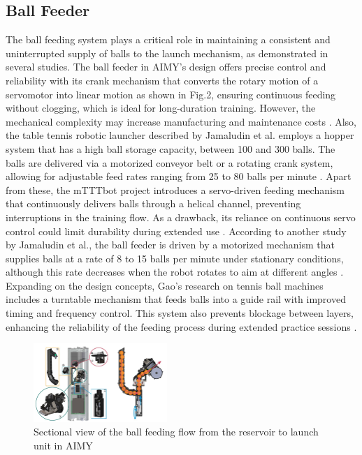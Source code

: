 \documentclass[12pt]{report}
\begin{document}
\subsection{Ball Feeder}

The ball feeding system plays a critical role in maintaining a consistent and uninterrupted supply of balls to the launch mechanism, as demonstrated in several studies. The ball feeder in AIMY’s design offers precise control and reliability with its crank mechanism that converts the rotary motion of a servomotor into linear motion as shown in Fig.2, ensuring continuous feeding without clogging, which is ideal for long-duration training. However, the mechanical complexity may increase manufacturing and maintenance costs \cite{Dittrich2023}. Also, the table tennis robotic launcher described by Jamaludin et al. employs a hopper system that has a high ball storage capacity, between 100 and 300 balls. The balls are delivered via a motorized conveyor belt or a rotating crank system, allowing for adjustable feed rates ranging from 25 to 80 balls per minute \cite{Jamaludin2022}. Apart from these, the mTTTbot project introduces a servo-driven feeding mechanism that continuously delivers balls through a helical channel, preventing interruptions in the training flow. As a drawback, its reliance on continuous servo control could limit durability during extended use \cite{Tasci2023}. According to another study by Jamaludin et al., the ball feeder is driven by a motorized mechanism that supplies balls at a rate of 8 to 15 balls per minute under stationary conditions, although this rate decreases when the robot rotates to aim at different angles \cite{Jamaludin2023}. Expanding on the design concepts, Gao’s research on tennis ball machines includes a turntable mechanism that feeds balls into a guide rail with improved timing and frequency control. This system also prevents blockage between layers, enhancing the reliability of the feeding process during extended practice sessions \cite{Gao2019}. 

\vspace{0.5cm}\begin{figure}[H]
\centering
\includegraphics[width=0.45\textwidth,height=0.26\textwidth]{figures/fig2.jpg}
\caption{Sectional view of the ball feeding flow from the reservoir to launch unit in AIMY \cite{Dittrich2023}}
\end{figure}
\end{document}
